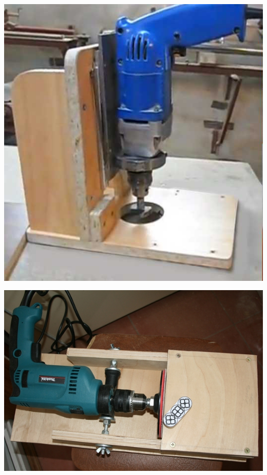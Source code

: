 {\begin{multicols}{2}
\noindent\includegraphics[width=\columnwidth]{00/fig/DrelBoren.jpg}

\noindent\includegraphics[width=\columnwidth]{00/fig/DrelShliph.jpg}


\end{multicols}}
